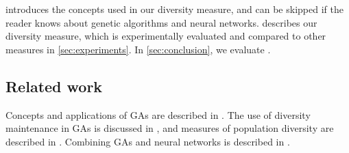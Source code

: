  introduces the concepts used in our diversity measure, and can be skipped if the reader knows about genetic algorithms and neural networks.  describes our diversity measure, which is experimentally evaluated and compared to other measures in \cref{sec:experiments}. In \cref{sec:conclusion}, we evaluate \dia.

\subsection{Related work}
Concepts and applications of GAs are described in \cite{Cobb93geneticalgorithms,DeJong:1975:ABC:907087,Luke2013Metaheuristics,Syswerda:1989:UCG:645512.657265,ursem2002diversity,fogarty,Whitley:1989:GAS:93126.93169,1250187}. The use of diversity maintenance in GAs is discussed in \cite{diaz2007empirical,Zitzler00comparisonof,Darwen00doesextra,1266373}, and measures of population diversity are described in \cite{Nguyen:2006:ASPGP,simpson1949measurement}. Combining GAs and neural networks is described in \cite{masterThesisGANN}.
